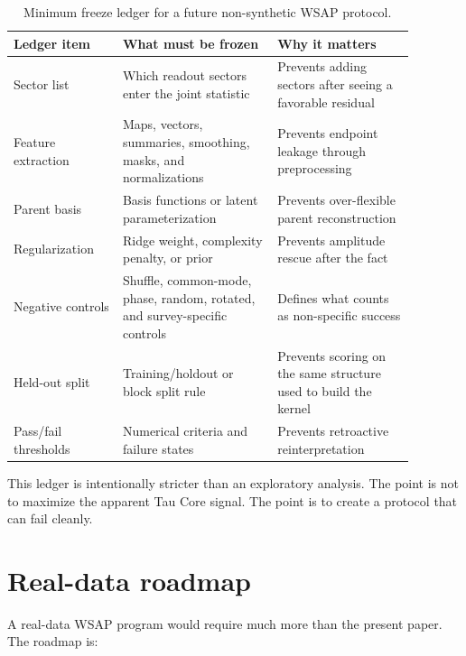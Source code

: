 \documentclass[12pt]{article}
\begin{document}
\begin{table}[t]
\centering
\small
\begin{tabular}{L{0.24\linewidth}L{0.34\linewidth}L{0.30\linewidth}}
\toprule
Ledger item & What must be frozen & Why it matters\\
\midrule
Sector list & Which readout sectors enter the joint statistic & Prevents
adding sectors after seeing a favorable residual\\
Feature extraction & Maps, vectors, summaries, smoothing, masks, and
normalizations & Prevents endpoint leakage through preprocessing\\
Parent basis & Basis functions or latent parameterization & Prevents
over-flexible parent reconstruction\\
Regularization & Ridge weight, complexity penalty, or prior & Prevents
amplitude rescue after the fact\\
Negative controls & Shuffle, common-mode, phase, random, rotated, and
survey-specific controls & Defines what counts as non-specific success\\
Held-out split & Training/holdout or block split rule & Prevents scoring on
the same structure used to build the kernel\\
Pass/fail thresholds & Numerical criteria and failure states & Prevents
retroactive reinterpretation\\
\bottomrule
\end{tabular}
\caption{Minimum freeze ledger for a future non-synthetic WSAP protocol.}
\label{tab:freeze-ledger}
\end{table}

This ledger is intentionally stricter than an exploratory analysis.  The point
is not to maximize the apparent Tau Core signal.  The point is to create a
protocol that can fail cleanly.

\section{Real-data roadmap}

A real-data WSAP program would require much more than the present paper.
The roadmap is:
\end{document}
